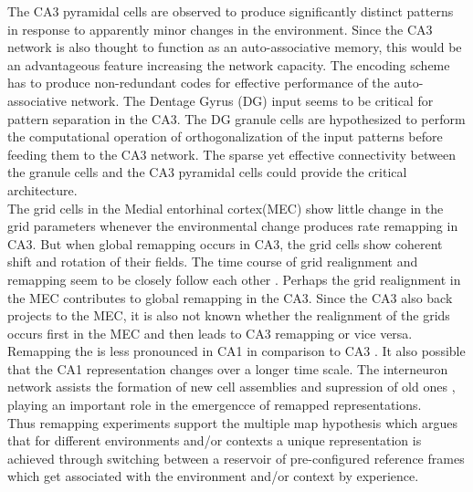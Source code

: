 The CA3 pyramidal cells are observed to produce significantly distinct patterns in response to apparently minor changes in the environment. Since the CA3 network is also thought to function as an auto-associative memory, this would be an advantageous feature increasing the network capacity. The encoding scheme has to produce non-redundant codes for effective performance of the auto-associative network. The Dentage Gyrus (DG) input seems to be critical for pattern separation in the CA3. The DG granule cells are hypothesized to perform the computational operation of orthogonalization of the input patterns before feeding them to the CA3 network. The sparse yet effective connectivity between the granule cells and the CA3 pyramidal cells could provide the critical architecture.\\ The grid cells in the Medial entorhinal cortex(MEC) show little change in the grid parameters whenever the environmental change produces rate remapping in CA3. But when global remapping occurs in CA3, the grid cells show coherent shift and rotation of their fields. The time course of grid realignment and remapping seem to be closely follow each other \cite{Fyhn2007}. Perhaps the grid realignment in the MEC contributes to global remapping in the CA3. Since the CA3 also back projects to the MEC, it is also not known whether the realignment of the grids occurs first in the MEC and then leads to CA3 remapping or vice versa. Remapping the is less pronounced in CA1 in comparison to CA3 \cite{Leutgeb2005a, Leutgeb2004}. It also possible that the CA1 representation changes over a longer time scale. The interneuron network assists the formation of new cell assemblies and supression of old ones \cite{Dupret2013}, playing an important role in the emergencce of remapped representations.\\ 

Thus remapping experiments support the multiple map hypothesis which argues that for different environments and/or contexts a unique representation is achieved through switching between a reservoir of pre-configured reference frames which get associated with the environment and/or context by experience.

